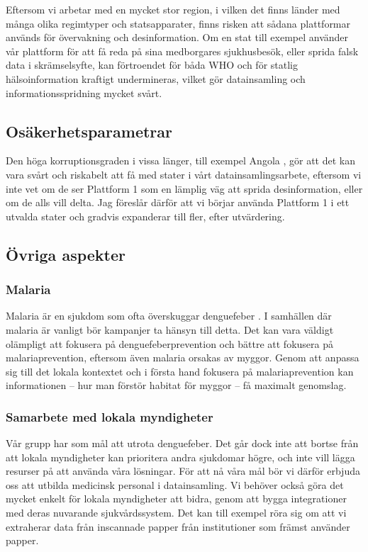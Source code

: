 \documentclass{article}
\begin{document}
Eftersom vi arbetar med en mycket stor region, i vilken det finns länder med många olika regimtyper och statsapparater, finns risken att sådana plattformar används för övervakning och desinformation. Om en stat till exempel använder vår plattform för att få reda på sina medborgares sjukhusbesök, eller sprida falsk data i skrämselsyfte, kan förtroendet för båda WHO och för statlig hälsoinformation kraftigt undermineras, vilket gör datainsamling och informationsspridning mycket svårt.

\subsection{Osäkerhetsparametrar}

Den höga korruptionsgraden i vissa länger, till exempel Angola , gör att det kan vara svårt och riskabelt att få med stater i vårt datainsamlingsarbete, eftersom vi inte vet om de ser Plattform 1 som en lämplig väg att sprida desinformation, eller om de alls vill delta. Jag föreslår därför att vi börjar använda Plattform 1 i ett utvalda stater och gradvis expanderar till fler, efter utvärdering.

\subsection{Övriga aspekter}

\subsubsection{Malaria}
Malaria är en sjukdom som ofta överskuggar denguefeber . I samhällen där malaria är vanligt bör kampanjer ta hänsyn till detta. Det kan vara väldigt olämpligt att fokusera på denguefeberprevention och bättre att fokusera på malariaprevention, eftersom även malaria orsakas av myggor. Genom att anpassa sig till det lokala kontextet och i första hand fokusera på malariaprevention kan informationen – hur man förstör habitat för myggor – få maximalt genomslag.

\subsubsection{Samarbete med lokala myndigheter}
Vår grupp har som mål att utrota denguefeber. Det går dock inte att bortse från att lokala myndigheter kan prioritera andra sjukdomar högre, och inte vill lägga resurser på att använda våra lösningar. För att nå våra mål bör vi därför erbjuda oss att utbilda medicinsk personal i datainsamling. Vi behöver också göra det mycket enkelt för lokala myndigheter att bidra, genom att bygga integrationer med deras nuvarande sjukvårdssystem. Det kan till exempel röra sig om att vi extraherar data från inscannade papper från institutioner som främst använder papper.
\end{document}
